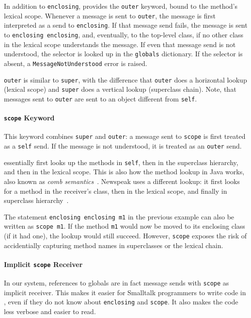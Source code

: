 In addition to \texttt{enclosing}, \msname provides the \texttt{outer} keyword, bound to the method's lexical scope. Whenever a message is sent to \texttt{outer}, the message is first interpreted as a send to \texttt{enclosing}. If that message send fails, the message is sent to \texttt{enclosing enclosing}, and, eventually, to the top-level class, if no other class in the lexical scope understands the message. If even that message send is not understood, the selector is looked up in the \texttt{globals} dictionary. If the selector is absent, a \texttt{MessageNotUnderstood} error is raised.

\texttt{outer} is similar to \texttt{super}, with the difference that \texttt{outer} does a horizontal lookup (lexical scope) and \texttt{super} does a vertical lookup (superclass chain). Note, that messages sent to \texttt{outer} are sent to an object different from \texttt{self}.

\paragraph{\texttt{scope} Keyword}
This keyword combines \texttt{super} and \texttt{outer}: a message sent to \texttt{scope} is first treated as a \texttt{self} send. If the message is not understood, it is treated as an \texttt{outer} send.

\msname essentially first looks up the methods in \texttt{self}, then in the superclass hierarchy, and then in the lexical scope. This is also how the method lookup in Java works, also known as \emph{comb semantics}~\cite{bracha2007interaction}. Newspeak uses a different lookup: it first looks for a method in the receiver's class, then in the lexical scope, and finally in superclass hierarchy~\cite{bracha:modules_as_objects}.

The statement \texttt{enclosing enclosing m1} in the previous example can also be written as \texttt{scope m1}. If the method \texttt{m1} would now be moved to its enclosing class (if it had one), the lookup would still succeed. However, \texttt{scope} exposes the risk of accidentially capturing method names in superclasses or the lexical chain.

\paragraph{Implicit \texttt{scope} Receiver}
In our system, references to globals are in fact message sends with \texttt{scope} as implicit receiver. This makes it easier for Smalltalk programmers to write code in \msname, even if they do not know about \texttt{enclosing} and \texttt{scope}. It also makes the code less verbose and easier to read.

